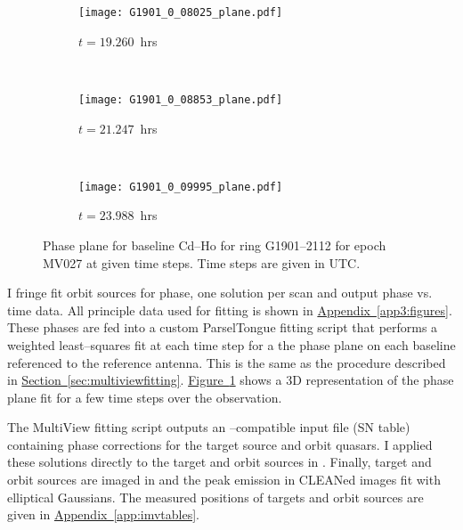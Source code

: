 		\begin{figure}[h]
			\centering
			\begin{subfigure}[t]{0.75\textwidth}
				\centering
				\texttt{[image: G1901\_0\_08025\_plane.pdf]}
				\caption[]{$t=19.260$~hrs}
			\end{subfigure}
			~
			\begin{subfigure}[t]{0.75\textwidth}
				\centering
				\texttt{[image: G1901\_0\_08853\_plane.pdf]}
				\caption[]{$t=21.247$~hrs}
			\end{subfigure}
			~
			\begin{subfigure}[t]{0.75\textwidth}
				\centering
				\texttt{[image: G1901\_0\_09995\_plane.pdf]}
				\caption[]{$t=23.988$~hrs}
			\end{subfigure}
			\caption[G1901 on baseline Cd--Ho]{Phase plane for baseline Cd--Ho for ring G1901--2112 for epoch MV027 at given time steps. Time steps are given in UTC.} \label{fig:phaseplanes}
		\end{figure}
		I fringe fit orbit sources for phase, one solution per scan and output phase vs. time data. All principle data used for fitting is shown in \hyperref[app3:figures]{Appendix~\ref*{app3:figures}}. These phases are fed into a custom ParselTongue fitting script that performs a weighted least--squares fit at each time step for a the phase plane on each baseline referenced to the reference antenna. This is the same as the procedure described in \hyperref[sec:multiviewfitting]{Section~\ref*{sec:multiviewfitting}}. \hyperref[fig:phaseplanes]{Figure~\ref*{fig:phaseplanes}} shows a 3D representation of the phase plane fit for a few time steps over the observation.		%
		
		The MultiView fitting script outputs an \aips--compatible input file (SN table) containing phase corrections for the target source and orbit quasars. I applied these solutions directly to the target and orbit sources in \aips. Finally, target and orbit sources are imaged in \aips\space and the peak emission in CLEANed images fit with elliptical Gaussians. The measured positions of targets and orbit sources are given in \hyperref[app:imvtables]{Appendix~\ref*{app:imvtables}}.

